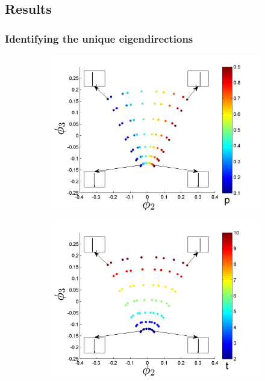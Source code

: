 \documentclass[preprint]{elsarticle}
\begin{document}
\subsection{Results}

\subsubsection{Identifying the unique eigendirections}

\begin{figure}[t!]
\centering
\begin{subfigure}{5cm}
\includegraphics[width=\textwidth]{EMD_withhist_p_1}
\caption{}
\label{subfig:small_lambda_p}
\end{subfigure}
\begin{subfigure}{5cm}
\includegraphics[width=\textwidth]{EMD_withhist_t_1}

\end{subfigure}
\end{figure}
\end{document}
